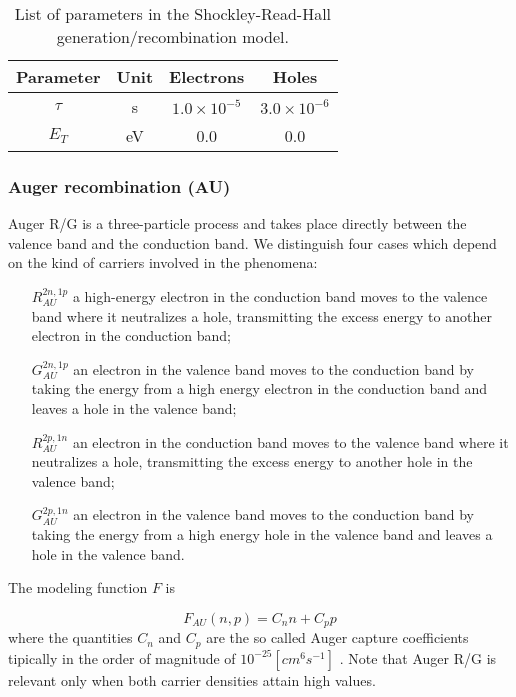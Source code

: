 \begin{table}[!h]
\centering
\begin{tabular}{cccc}
\toprule
Parameter & Unit & Electrons & Holes \\
\midrule
$\tau$ & s & $1.0\times 10^{-5}$ & $3.0 \times 10^{-6}$\\
$E_T$ & eV & 0.0 & 0.0\\
\bottomrule
\end{tabular}
\caption{List of parameters in the Shockley-Read-Hall generation/recombination model.}
\end{table}

\subsubsection{Auger recombination (AU)}

Auger R/G is a three-particle process and takes place directly between the valence band and the conduction band. We distinguish four cases which depend on the kind of carriers involved in the phenomena:

\begin{itemize}[leftmargin=1.5cm]
\item[$R_{AU}^{2n,1p}$] a high-energy electron in the conduction band moves to the valence band where it neutralizes a hole, transmitting the excess energy to another electron in the conduction band;
\item[$G_{AU}^{2n,1p}$] an electron in the valence band moves to the conduction band by taking the energy from a high energy electron in the conduction band and leaves a hole in the valence band;
\item[$R_{AU}^{2p,1n}$] an electron in the conduction band moves to the valence band where it neutralizes a hole, transmitting the excess energy to another hole in the valence band;
\item[$G_{AU}^{2p,1n}$] an electron in the valence band moves to the conduction band by taking the energy from a high energy hole in the valence band and leaves a hole in the valence band.
\end{itemize}

The modeling function $F$ is

\begin{equation}
F_{AU}(n,p) = C_nn+C_pp
\end{equation}
where the quantities $C_n$ and $C_p$ are the so called  Auger capture coefficients tipically in the order of magnitude of $10^{-25}[cm^6s^{-1}]$ \cite{Lochmann}.
Note that Auger R/G is relevant only when both carrier densities attain high values.

